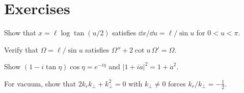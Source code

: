 \section*{Exercises}
\begin{exercise}
Show that $x=\ell\log\tan(u/2)$ satisfies $\dd x/\dd u=\ell/\sin u$ for $0<u<\pi$.
\end{exercise}
\begin{exercise}
Verify that $\Omega=\ell/\sin u$ satisfies $\Omega''+2\cot u\,\Omega'=\Omega$.
\end{exercise}
\begin{exercise}
Show $(1-i\tan\eta)\cos\eta=e^{-i\eta}$ and $|1+i\dot a|^2=1+\dot a^2$.
\end{exercise}
\begin{exercise}
For vacuum, show that $2k_rk_\perp+k_\perp^2=0$ with $k_\perp\ne0$ forces $k_r/k_\perp=-\frac12$.
\end{exercise}

